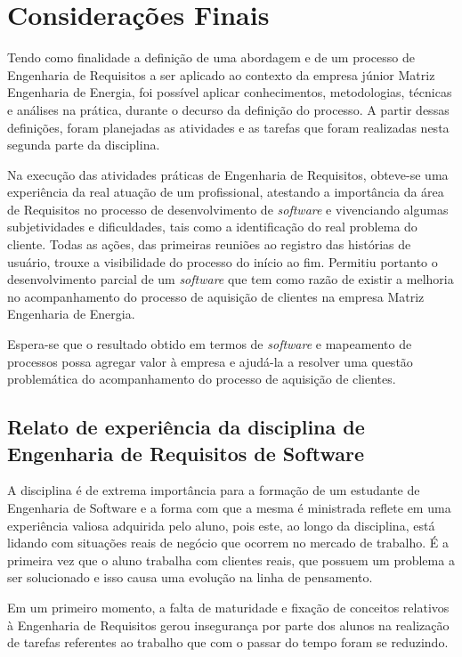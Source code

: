\chapter[Considerações Finais]{Considerações Finais}
Tendo como finalidade a definição de uma abordagem e de um processo de Engenharia de Requisitos a ser aplicado ao contexto da empresa júnior Matriz Engenharia de Energia, foi possível aplicar conhecimentos, metodologias, técnicas e análises na prática, durante o decurso da definição do processo. A partir dessas definições, foram planejadas as atividades e as tarefas que foram realizadas nesta segunda parte da disciplina.

Na execução das atividades práticas de Engenharia de Requisitos, obteve-se uma experiência da real atuação de um profissional, atestando a importância da área de Requisitos no processo de desenvolvimento de \textit{software} e vivenciando algumas subjetividades e dificuldades, tais como a identificação do real problema do cliente. Todas as ações, das primeiras reuniões ao registro das histórias de usuário, trouxe a visibilidade do processo do início ao fim. Permitiu portanto o desenvolvimento parcial de um \textit{software} que tem como razão de existir a melhoria no acompanhamento do processo de aquisição de clientes na empresa Matriz Engenharia de Energia.

Espera-se que o resultado obtido em termos de \textit{software} e mapeamento de processos possa agregar valor à empresa e ajudá-la a resolver uma questão problemática do acompanhamento do processo de aquisição de clientes.

\section{Relato de experiência da disciplina de Engenharia de Requisitos de Software}

\indent A disciplina é de extrema importância para a formação de um estudante de Engenharia de Software e a 
forma com que a mesma é ministrada reflete em uma experiência valiosa adquirida pelo aluno, pois este, ao longo
da disciplina, está lidando com situações reais de negócio que ocorrem no mercado de trabalho. É a primeira vez 
que o aluno trabalha com clientes reais, que possuem um problema a ser solucionado e isso causa uma evolução na 
linha de pensamento.

\indent Em um primeiro momento, a falta de maturidade e fixação de conceitos relativos à Engenharia de Requisitos 
gerou insegurança por parte dos alunos na realização de tarefas referentes ao trabalho que com o passar do tempo 
foram se reduzindo.

